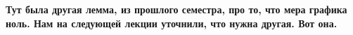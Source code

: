 \begin{Rem}\textbf{
	Тут была другая лемма, из прошлого семестра, про то, что мера графика ноль.
	Нам на следующей лекции уточнили, что нужна другая.
	Вот она.
}\end{Rem}

